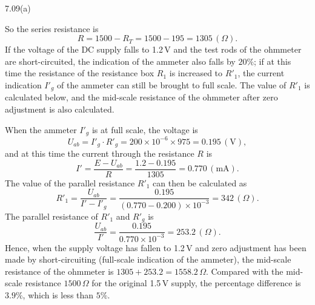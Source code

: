 \begin{figbox}{7.09(a)}
\end{figbox}

So the series resistance is
\[
R=1500-R_T=1500-195=1305\,(\Omega).
\]
If the voltage of the DC supply falls to 1.2\,V and the test rods of the ohmmeter are short-circuited, the indication of the ammeter also falls by $20\%$; if at this time the resistance of the resistance box $R_1$ is increased to $R'_1$, the current indication $I'_g$ of the ammeter can still be brought to full scale. The value of $R'_1$ is calculated below, and the mid-scale resistance of the ohmmeter after zero adjustment is also calculated.

When the ammeter $I'_g$ is at full scale, the voltage is
\[
U_{ab}=I'_g\cdot R'_g=200\times10^{-6}\times975=0.195\,(\mathrm{V}),
\]
and at this time the current through the resistance $R$ is
\[
I'=\frac{E-U_{ab}}{R}=\frac{1.2-0.195}{1305}=0.770\,(\mathrm{mA}).
\]
The value of the parallel resistance $R'_1$ can then be calculated as
\[
R'_1=\frac{U_{ab}}{I'-I'_g}=\frac{0.195}{(0.770-0.200)\times10^{-3}}=342\,(\Omega).
\]
The parallel resistance of $R'_1$ and $R'_g$ is
\[
\frac{U_{ab}}{I'}=\frac{0.195}{0.770\times10^{-3}}=253.2\,(\Omega).
\]
Hence, when the supply voltage has fallen to 1.2\,V and zero adjustment has been made by short-circuiting (full-scale indication of the ammeter), the mid-scale resistance of the ohmmeter is $1305+253.2=1558.2\,\Omega$. Compared with the mid-scale resistance $1500\,\Omega$ for the original 1.5\,V supply, the percentage difference is $3.9\%$, which is less than $5\%$.

